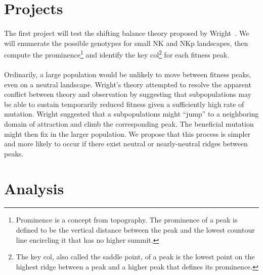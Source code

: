 \documentclass[12pt,letterpaper,titlepage,draft]{article}
\begin{document}
\section*{Projects}

\paragraph{}
The first project will test the shifting balance theory proposed by
Wright~\cite{Wright1982}. We will enumerate the possible genotypes for small NK
and NKp landscapes, then compute the prominence\footnote{Prominence is a
concept from topography. The prominence of a peak is defined to be the
vertical distance between the peak and the lowest countour line encircling it
that has no higher summit.} and identify the key col\footnote{The key col, also
called the saddle point, of a peak is the lowest point on the highest ridge
between a peak and a higher peak that defines its prominence.} for each fitness
peak.

\paragraph{}
Ordinarily, a large population would be unlikely to move between fitness peaks, even on a neutral landscape. Wright's theory attempted to resolve the apparent conflict between theory and observation by suggesting that subpopulations may be able to sustain temporarily reduced fitness given a sufficiently high rate of mutation. Wright suggested that a subpopulations might ``jump'' to a neighboring domain of attraction and climb the corresponding peak. The beneficial mutation might then fix in the larger population. We propose that this process is simpler and more likely to occur if there exist neutral or nearly-neutral ridges between peaks.

\section*{Analysis}

{}

\end{document}
